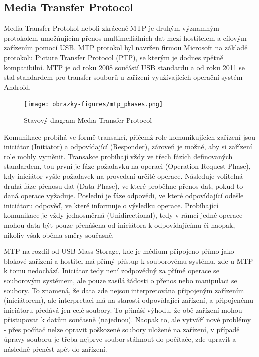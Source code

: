 

\subsection{Media Transfer Protocol}
Media Transfer Protokol neboli zkráceně MTP je druhým významným protokolem umožňujícím přenos multimediálních dat mezi hostitelem a cílovým zařízením pomocí USB. MTP protokol byl navržen firmou Microsoft na základě protokolu Picture Transfer Protocol (PTP), se kterým je dodnes zpětně kompatibilní. MTP je od roku 2008 součástí USB standardu a od roku 2011 se stal standardem pro transfer souborů u zařízení využívajících operační systém Android. 

\begin{figure}[h]
    \centering
    \texttt{[image: obrazky-figures/mtp\_phases.png]}
    
    \caption{Stavový diagram Media Transfer Protocol \cite{silicon_labs_mass_storage_protocol}}
    \label{fig:mtp-protocol}
\end{figure}

Komunikace probíhá ve formě transakcí, přičemž role komunikujících zařízení jsou iniciátor (Initiator) a odpovídající (Responder), zároveň je možné, aby si zařízení role mohly vyměnit. Transakce probíhají vždy ve třech fázích definovaných standardem, tou první je fáze požadavku na operaci (Operation Request Phase), kdy iniciátor vyšle požadavek na provedení určité operace. Následuje volitelná druhá fáze přenosu dat (Data Phase), ve které proběhne přenos dat, pokud to daná operace vyžaduje. Poslední je fáze odpovědi, ve které odpovídající odešle iniciátoru odpověď, ve které informuje o výsledku operace. Probíhající komunikace je vždy jednosměrná (Unidirectional), tedy v rámci jedné operace mohou data být pouze přenášena od iniciátora k odpovídajícímu či naopak, nikoliv však oběma směry současně. 


MTP na rozdíl od USB Mass Storage, kde je médium připojeno přímo jako blokové zařízení a hostitel má přímý přístup k souborovému systému, zde u MTP k tomu nedochází. Iniciátor tedy není zodpovědný za přímé operace se souborovým systémem, ale pouze zasílá žádosti o přenos nebo manipulaci se soubory. To znamená, že data zde nejsou interpretována připojeným zařízením (iniciátorem), ale interpretaci má na starosti odpovídající zařízení, a připojenému iniciátoru předává jen celé soubory. To přináší výhodu, že obě zařízení mohou přistupovat k datům současně (najednou). Naopak to, ale vytváří nové problémy - přes počítač nelze opravit poškozené soubory uložené na zařízení, v případě úpravy souboru je třeba nejprve soubor stáhnout do počítače, zde upravit a následně přenést zpět do zařízení.


